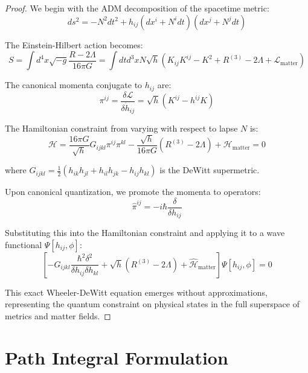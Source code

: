 \documentclass{article}
\begin{document}
\begin{proof}
We begin with the ADM decomposition of the spacetime metric:
\begin{equation}
ds^2 = -N^2dt^2 + h_{ij}(dx^i + N^i dt)(dx^j + N^j dt)
\end{equation}

The Einstein-Hilbert action becomes:
\begin{equation}
S = \int d^4x \sqrt{-g} \frac{R - 2\Lambda}{16\pi G} = \int dt d^3x N\sqrt{h} \left( K_{ij}K^{ij} - K^2 + R^{(3)} - 2\Lambda + \mathcal{L}_\text{matter} \right)
\end{equation}

The canonical momenta conjugate to $h_{ij}$ are:
\begin{equation}
\pi^{ij} = \frac{\delta \mathcal{L}}{\delta \dot{h}_{ij}} = \sqrt{h}(K^{ij} - h^{ij}K)
\end{equation}

The Hamiltonian constraint from varying with respect to lapse $N$ is:
\begin{equation}
\mathcal{H} = \frac{16\pi G}{\sqrt{h}}G_{ijkl}\pi^{ij}\pi^{kl} - \frac{\sqrt{h}}{16\pi G}(R^{(3)} - 2\Lambda) + \mathcal{H}_\text{matter} = 0
\end{equation}

where $G_{ijkl} = \frac{1}{2}(h_{ik}h_{jl} + h_{il}h_{jk} - h_{ij}h_{kl})$ is the DeWitt supermetric.

Upon canonical quantization, we promote the momenta to operators:
\begin{equation}
\hat{\pi}^{ij} = -i\hbar\frac{\delta}{\delta h_{ij}}
\end{equation}

Substituting this into the Hamiltonian constraint and applying it to a wave functional $\Psi[h_{ij}, \phi]$:
\begin{equation}
\left[ -G_{ijkl}\frac{\hbar^2 \delta^2}{\delta h_{ij} \delta h_{kl}} + \sqrt{h}(R^{(3)} - 2\Lambda) + \hat{\mathcal{H}}_\text{matter} \right] \Psi[h_{ij}, \phi] = 0
\end{equation}

This exact Wheeler-DeWitt equation emerges without approximations, representing the quantum constraint on physical states in the full superspace of metrics and matter fields.
\end{proof}

\section{Path Integral Formulation}
\end{document}
